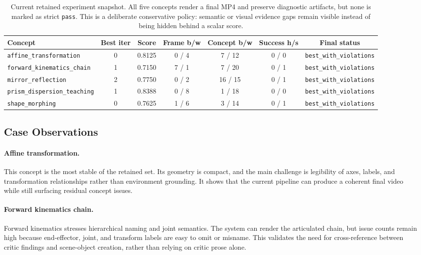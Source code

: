 \documentclass[10pt,letterpaper]{article}
\begin{document}
\begin{table}[H]
\centering
\footnotesize
\setlength{\tabcolsep}{3.2pt}
\begin{tabular}{lcccccc}
\toprule
Concept & Best iter & Score & Frame b/w & Concept b/w & Success h/s & Final status \\
\midrule
\texttt{affine\_transformation} & 0 & 0.8125 & 0 / 4 & 7 / 12 & 0 / 0 & \texttt{best\_with\_violations} \\
\texttt{forward\_kinematics\_chain} & 1 & 0.7150 & 7 / 1 & 7 / 20 & 0 / 1 & \texttt{best\_with\_violations} \\
\texttt{mirror\_reflection} & 2 & 0.7750 & 0 / 2 & 16 / 15 & 0 / 1 & \texttt{best\_with\_violations} \\
\texttt{prism\_dispersion\_teaching} & 1 & 0.8388 & 0 / 8 & 1 / 18 & 0 / 0 & \texttt{best\_with\_violations} \\
\texttt{shape\_morphing} & 0 & 0.7625 & 1 / 6 & 3 / 14 & 0 / 1 & \texttt{best\_with\_violations} \\
\bottomrule
\end{tabular}
\caption{Current retained experiment snapshot. All five concepts render a
final MP4 and preserve diagnostic artifacts, but none is marked as strict
\texttt{pass}. This is a deliberate conservative policy: semantic or visual
evidence gaps remain visible instead of being hidden behind a scalar score.}
\label{tab:current-results}
\end{table}

\subsection{Case Observations}

\paragraph{Affine transformation.}
This concept is the most stable of the retained set. Its geometry is compact,
and the main challenge is legibility of axes, labels, and transformation
relationships rather than environment grounding. It shows that the current
pipeline can produce a coherent final video while still surfacing residual
concept issues.

\paragraph{Forward kinematics chain.}
Forward kinematics stresses hierarchical naming and joint semantics. The
system can render the articulated chain, but issue counts remain high because
end-effector, joint, and transform labels are easy to omit or misname.
This validates the need for cross-reference between critic findings and
scene-object creation, rather than relying on critic prose alone.
\end{document}
